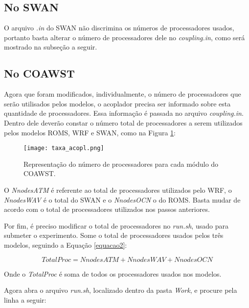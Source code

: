 \subsection{No SWAN}

\bigskip O arquivo \textit{.in} do SWAN não discrimina os números de processadores usados, portanto basta alterar o número
        de processadores dele no \textit{coupling.in}, como será mostrado na subseção a seguir.
\bigskip

\subsection{No COAWST}
\bigskip

\noindent Agora que foram modificados, individualmente, o número de processadores que serão utilisados pelos modelos, 
          o acoplador precisa ser informado sobre esta quantidade de processadores. Essa informação é passada no arquivo \textit{coupling.in}.
          Dentro dele deverão constar o número total de processadores a serem utilizados pelos modelos ROMS, WRF e SWAN, como
          na Figura \textcolor{bleu_cite}{\ref{procscoa}}:
\bigskip

\begin{figure}[H]
    \centering
    \texttt{[image: taxa\_acopl.png]}
    \caption{Representação do número de processadores para cada módulo do COAWST.}
    \label{procscoa}
\end{figure}
\bigskip

\noindent O \textit{NnodesATM} é referente ao total de processadores utilizados pelo WRF, o \textit{NnodesWAV} é o 
          total do SWAN e o \textit{NnodesOCN} o do ROMS. Basta mudar de acordo com o total de processadores utilizados 
          nos passos anteriores.
\bigskip

\noindent Por fim, é preciso modificar o total de processadores no \textit{run.sh}, usado para submeter o experimento. 
          Some o total de processadores usados pelos três modelos, seguindo a Equação \textcolor{bleu_cite}{\ref{equacao2}}:
\bigskip

\begin{equation}
TotalProc = NnodesATM + NnodesWAV + NnodesOCN
\label{equacao2}
\end{equation}
\bigskip

\noindent Onde o \textit{TotalProc} é soma de todos os processadores usados nos modelos.
\bigskip

\noindent Agora abra o arquivo \textit{run.sh}, localizado dentro da pasta \textit{Work}, e procure pela linha a seguir:
\bigskip

